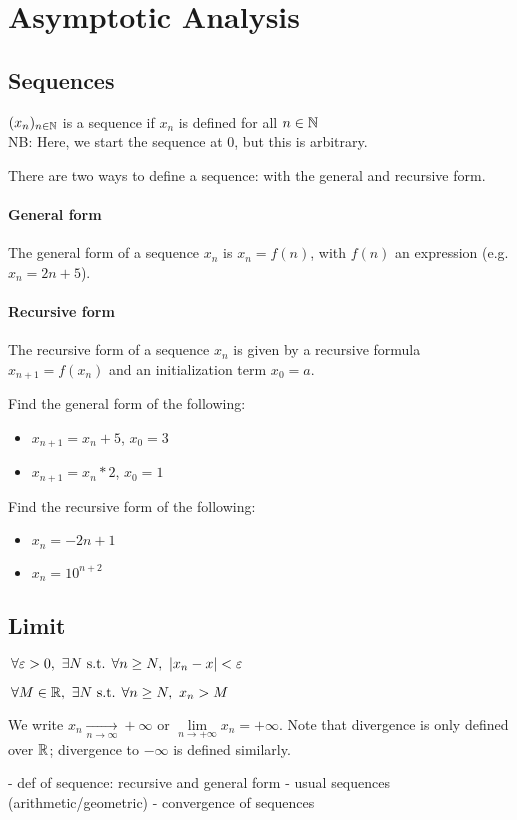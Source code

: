 \section{Asymptotic Analysis}

\subsection{Sequences}
\begin{definition}[Sequence]
	$(x_n)_{n\in \mathbb{N}}$ is a sequence if $x_n$ is defined for all $n \in \mathbb{N}$\\
    NB: Here, we start the sequence at $0$, but this is arbitrary.
\end{definition}
There are two ways to define a sequence: with the general and recursive form.

\paragraph{General form}
The general form of a sequence $x_n$ is $x_n = f(n)$, with $f(n)$ an expression (e.g. $x_n = 2n+5$).
\paragraph{Recursive form}
The recursive form of a sequence $x_n$ is given by a recursive formula $x_{n+1} = f(x_n)$ and an initialization term $x_0 = a$.

\begin{question}
    Find the general form of the following:
    \begin{itemize}
        \item $x_{n+1} = x_n+5$, $x_0=3$
        \item $x_{n+1} = x_n*2$, $x_0=1$
    \end{itemize}
\end{question}
\begin{question}
    Find the recursive form of the following:
    \begin{itemize}
        \item $x_n = -2n+1$
        \item $x_n = 10^{n+2}$
    \end{itemize}
\end{question}



\subsection{Limit}
\begin{definition}
    $\,\forall \varepsilon > 0, \ \exists N \text{ s.t. } \forall n \geq N, \ | x_n-x | < \varepsilon$
\end{definition}
\begin{definition}
    $\,\forall M \in \mathbb{R}, \ \exists N \text{ s.t. } \forall n \geq N, \ x_n > M$
\end{definition}
We write $x_n \xrightarrow[n \to \infty]{} +\infty \text{ or } \lim\limits_{n \to +\infty} x_n = +\infty$.
Note that divergence is only defined over $\mathbb{R}$; divergence to $-\infty$ is defined similarly.

- def of sequence: recursive and general form
- usual sequences (arithmetic/geometric)
- convergence of sequences